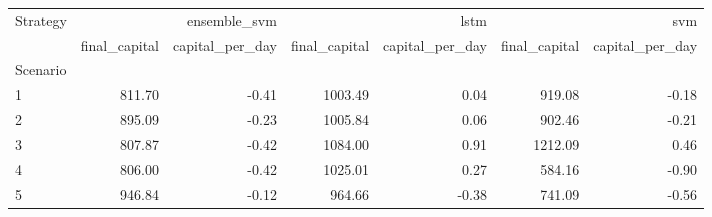 \begin{tabular}{lrrrrrr}
\toprule
Strategy & \multicolumn{2}{r}{ensemble_svm} & \multicolumn{2}{r}{lstm} & \multicolumn{2}{r}{svm} \\
 & final_capital & capital_per_day & final_capital & capital_per_day & final_capital & capital_per_day \\
Scenario &  &  &  &  &  &  \\
\midrule
1 & 811.70 & -0.41 & 1003.49 & 0.04 & 919.08 & -0.18 \\
2 & 895.09 & -0.23 & 1005.84 & 0.06 & 902.46 & -0.21 \\
3 & 807.87 & -0.42 & 1084.00 & 0.91 & 1212.09 & 0.46 \\
4 & 806.00 & -0.42 & 1025.01 & 0.27 & 584.16 & -0.90 \\
5 & 946.84 & -0.12 & 964.66 & -0.38 & 741.09 & -0.56 \\
\bottomrule
\end{tabular}
